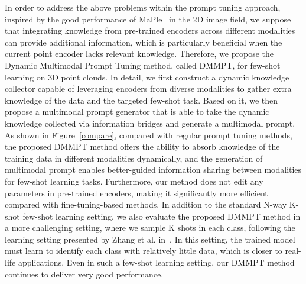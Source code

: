 \documentclass{ecai}
\begin{document}
In order to address the above problems within the prompt tuning approach, inspired by the good performance of MaPle~\cite{khattak2023maple} in the 2D image field, we suppose that integrating knowledge from pre-trained encoders across different modalities can provide additional information, which is particularly beneficial when the current point encoder lacks relevant knowledge. Therefore, we propose the Dynamic Multimodal Prompt Tuning method, called DMMPT, for few-shot learning on 3D point clouds. In detail, we first construct a dynamic knowledge collector capable of leveraging encoders from diverse modalities to gather extra knowledge of the data and the targeted few-shot task. Based on it, we then propose a multimodal prompt generator that is able to take the dynamic knowledge collected via information bridges and generate a multimodal prompt. As shown in Figure~\ref{compare}, compared with regular prompt tuning methods, the proposed DMMPT method offers the ability to absorb knowledge of the training data in different modalities dynamically, and the generation of multimodal prompt enables better-guided information sharing between
modalities for few-shot learning tasks. Furthermore, our method does not edit any parameters in pre-trained encoders, making it significantly more efficient compared with fine-tuning-based methods. 
In addition to the standard N-way K-shot few-shot learning setting, we also evaluate the proposed DMMPT method in a more challenging setting, where we sample K shots in each class, following the learning setting presented by Zhang et al. in~\cite{zhang2022pointclip}.
In this setting, the trained model must learn to identify each class with relatively little data, which is closer to real-life applications. Even in such a few-shot learning setting, our DMMPT method continues to deliver very good performance.
\end{document}
